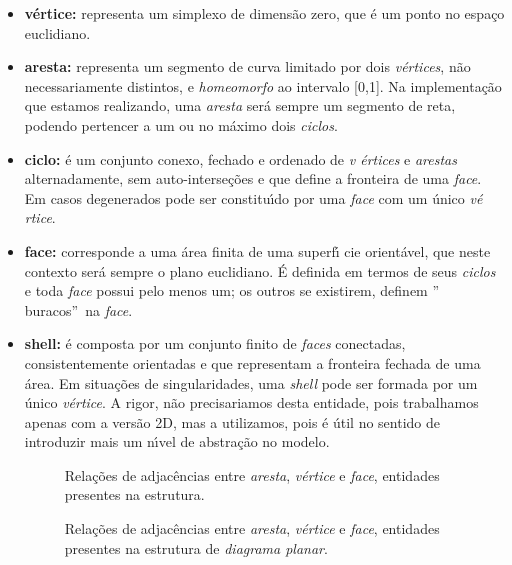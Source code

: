 \documentclass[12pt,a4paper]{book}
\begin{document}
\begin{itemize}
\item \textbf{v\'{e}rtice:} representa um simplexo de dimens\~{a}o zero, que 
\'{e} um ponto no espa\c{c}o euclidiano.

\item \textbf{aresta:} representa um segmento de curva limitado por dois 
\textit{v\'{e}rtices}, n\~{a}o necessariamente distintos, e \textit{homeomorfo}
ao intervalo [0,1]. Na implementa\c{c}\~{a}o que estamos realizando, uma 
\textit{aresta} ser\'{a} sempre um segmento de reta, podendo pertencer a um ou
no m\'{a}ximo dois \textit{ciclos}.

\item \textbf{ciclo:} \'{e} um conjunto conexo, fechado e ordenado de \textit{v%
\'{e}rtices} e \textit{arestas} alternadamente, sem auto-interse\c{c}\~{o}es e
que define a fronteira de uma \textit{face}. Em casos degenerados
pode ser constitu\'{\i}do por uma \textit{face} com um \'{u}nico \textit{v\'{e}%
rtice}.

\item \textbf{face:} corresponde a uma \'{a}rea finita de uma superf\'{\i}%
cie orient\'{a}vel, que neste contexto ser\'{a} sempre o plano euclidiano. 
\'{E} definida em termos de seus \textit{ciclos} e toda \textit{face} possui
pelo menos um; os outros se existirem, definem \textquotedblright
buracos\textquotedblright\ na \textit{face}.

\item \textbf{shell:} \'{e} composta por um conjunto finito de \textit{faces} conectadas, consistentemente orientadas e que representam a fronteira fechada de uma \'area. Em situa\c{c}\~{o}es de singularidades, uma \textit{shell} pode ser formada por um \'{u}nico \textit{v\'{e}rtice}. A rigor, n\~{a}o precisariamos desta entidade, pois trabalhamos apenas com a vers\~{a}o 2D, mas a utilizamos, pois \'{e} \'{u}til no sentido de introduzir mais um n\'{\i}vel de abstra\c{c}\~{a}o no modelo.

\begin{figure}[htbp]
  \begin{center}
    \leavevmode
    
    \caption{Rela\c{c}\~{o}es de adjac\^{e}ncias entre {\textit{aresta}}, {\textit{v\'{e}rtice}} e {\textit{face}}, entidades presentes na estrutura.}
    \label{fig6_chapter4}
  \end{center}
\end{figure}

\begin{figure}[htbp]
  \begin{center}
    \leavevmode
    
    \caption{Rela\c{c}\~{o}es de adjac\^{e}ncias entre {\textit{aresta}}, {\textit{v\'{e}rtice}} e {\textit{face}},
	              entidades presentes na estrutura de {\textit{diagrama planar}}.  }   
    \label{fig7_chapter4}
  \end{center}
\end{figure}


\end{itemize}
\end{document}
